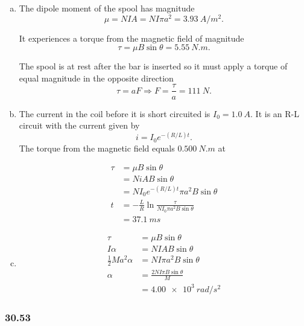 \documentclass{article}
\begin{document}
\begin{enumerate}[(a)]
  \item The dipole moment of the spool has magnitude \[\mu = N I A = N I \pi a^2 = \qty{3.93}{A/m^2}.\]

        It experiences a torque from the magnetic field of magnitude \[\tau = \mu B \sin \theta = \qty{5.55}{N.m}.\]

        The spool is at rest after the bar is inserted so it must apply a torque of equal magnitude in the opposite direction \[\tau = a F \Rightarrow F = \frac{\tau}{a} = \qty{111}{N}.\]

  \item The current in the coil before it is short circuited is $I_0 = \qty{1.0}{A}$. It is an R-L circuit with the current given by \[i = I_0 e^{-(R / L) t}.\] The torque from the magnetic field equals $\qty{0.500}{N.m}$ at

        \begin{align*}
          \tau & = \mu B \sin \theta                                         \\
               & = N i A B \sin \theta                                       \\
               & = N I_0 e^{-(R / L) t} \pi a^2 B \sin \theta                \\
          t    & = -\frac{L}{R} \ln \frac{\tau}{N I_0 \pi a^2 B \sin \theta} \\
               & = \qty{37.1}{ms}
        \end{align*}

  \item

        \begin{align*}
          \tau                     & = \mu B \sin \theta                 \\
          I \alpha                 & = N I A B \sin \theta               \\
          \frac{1}{2} M a^2 \alpha & = N I \pi a^2 B \sin \theta         \\
          \alpha                   & = \frac{2 N I \pi B \sin \theta}{M} \\
                                   & = \qty{4.00e3}{rad/s^2}
        \end{align*}
\end{enumerate}

\subsubsection{30.53}
\end{document}
